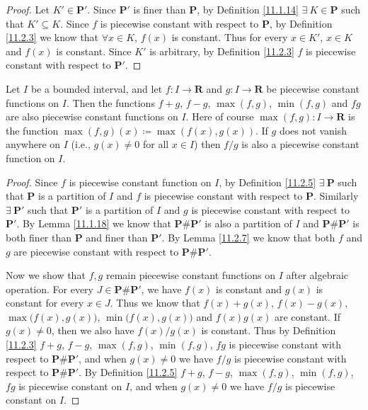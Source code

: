 \begin{proof}
    Let \(K' \in \mathbf{P}'\).
    Since \(\mathbf{P}'\) is finer than \(\mathbf{P}\), by Definition \ref{11.1.14} \(\exists\ K \in \mathbf{P}\) such that \(K' \subseteq K\).
    Since \(f\) is piecewise constant with respect to \(\mathbf{P}\), by Definition \ref{11.2.3} we know that \(\forall x \in K\), \(f(x)\) is constant.
    Thus for every \(x \in K'\), \(x \in K\) and \(f(x)\) is constant.
    Since \(K'\) is arbitrary, by Definition \ref{11.2.3} \(f\) is piecewise constant with respect to \(\mathbf{P}'\).
\end{proof}

\begin{lemma}\label{11.2.8}
    Let \(I\) be a bounded interval, and let \(f : I \to \mathbf{R}\) and \(g : I \to \mathbf{R}\) be piecewise constant functions on \(I\).
    Then the functions \(f + g\), \(f - g\), \(\max(f, g)\), \(\min(f, g)\) and \(fg\) are also piecewise constant functions on \(I\).
    Here of course \(\max(f, g) : I \to \mathbf{R}\) is the function \(\max(f, g)(x) \coloneqq \max(f(x), g(x))\).
    If \(g\) does not vanish anywhere on \(I\) (i.e., \(g(x) \neq 0\) for all \(x \in I\)) then \(f / g\) is also a piecewise constant function on \(I\).
\end{lemma}

\begin{proof}
    Since \(f\) is piecewise constant function on \(I\), by Definition \ref{11.2.5} \(\exists\ \mathbf{P}\) such that \(\mathbf{P}\) is a partition of \(I\) and \(f\) is piecewise constant with respect to \(\mathbf{P}\).
    Similarly \(\exists\ \mathbf{P}'\) such that \(\mathbf{P}'\) is a partition of \(I\) and \(g\) is piecewise constant with respect to \(\mathbf{P}'\).
    By Lemma \ref{11.1.18} we know that \(\mathbf{P} \# \mathbf{P}'\) is also a partition of \(I\) and \(\mathbf{P} \# \mathbf{P}'\) is both finer than \(\mathbf{P}\) and finer than \(\mathbf{P}'\).
    By Lemma \ref{11.2.7} we know that both \(f\) and \(g\) are piecewise constant with respect to \(\mathbf{P} \# \mathbf{P}'\).

    Now we show that \(f, g\) remain piecewise constant functions on \(I\) after algebraic operation.
    For every \(J \in \mathbf{P} \# \mathbf{P}'\), we have \(f(x)\) is constant and \(g(x)\) is constant for every \(x \in J\).
    Thus we know that \(f(x) + g(x)\), \(f(x) - g(x)\), \(\max\big(f(x), g(x)\big)\), \(\min\big(f(x), g(x)\big)\) and \(f(x) g(x)\) are constant.
    If \(g(x) \neq 0\), then we also have \(f(x) / g(x)\) is constant.
    Thus by Definition \ref{11.2.3} \(f + g\), \(f - g\), \(\max(f, g)\), \(\min(f, g)\), \(fg\) is piecewise constant with respect to \(\mathbf{P} \# \mathbf{P}'\), and when \(g(x) \neq 0\) we have \(f / g\) is piecewise constant with respect to \(\mathbf{P} \# \mathbf{P}'\).
    By Definition \ref{11.2.5} \(f + g\), \(f - g\), \(\max(f, g)\), \(\min(f, g)\), \(fg\) is piecewise constant on \(I\), and when \(g(x) \neq 0\) we have \(f / g\) is piecewise constant on \(I\).
\end{proof}

